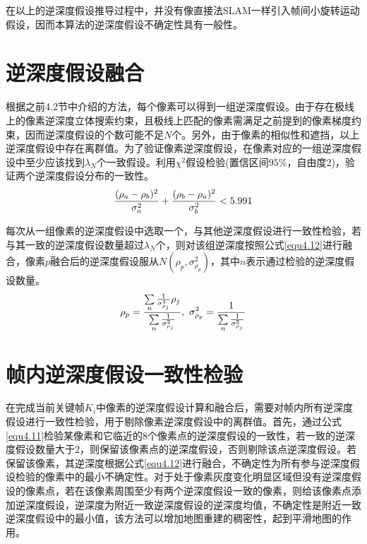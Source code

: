在以上的逆深度假设推导过程中，并没有像直接法SLAM一样引入帧间小旋转运动假设，因而本算法的逆深度假设不确定性具有一般性。


\section{逆深度假设融合}
根据之前4.2节中介绍的方法，每个像素可以得到一组逆深度假设。由于存在极线上的像素逆深度立体搜索约束，且极线上匹配的像素需满足之前提到的像素梯度约束，因而逆深度假设的个数可能不足$N$个。另外，由于像素的相似性和遮挡，以上逆深度假设中存在离群值。为了验证像素逆深度假设，在像素对应的一组逆深度假设中至少应该找到$\lambda_N$个一致假设。利用$\chi^2$假设检验(置信区间$95\%$，自由度2)，验证两个逆深度假设分布的一致性。
\begin{equation}
\label{equ4.11}
{ (\rho_a - \rho_b)^2 \over \sigma_a^2 }+{ (\rho_b - \rho_a)^2 \over \sigma_b^2} < 5.991
\end{equation}

每次从一组像素的逆深度假设中选取一个，与其他逆深度假设进行一致性检验，若与其一致的逆深度假设数量超过$\lambda_N$个，则对该组逆深度按照公式\ref{equ4.12}进行融合，像素$p$融合后的逆深度假设服从$N(\rho_p,\sigma_{\rho_p}^2)$，其中$n$表示通过检验的逆深度假设数量。
\begin{equation}
\label{equ4.12}
\rho_p = { {\sum\limits_n {1 \over \sigma_{\rho_j}^2} \rho_j } \over \sum\limits_n {1 \over \sigma_{\rho_j}^2}  }, \ 
\sigma_{\rho_p}^2 = {1 \over  \sum\limits_n { 1 \over \sigma_{\rho_j}^2}  }
\end{equation}


\section{帧内逆深度假设一致性检验}
在完成当前关键帧$K_i$中像素的逆深度假设计算和融合后，需要对帧内所有逆深度假设进行一致性检验，用于剔除像素逆深度假设中的离群值。首先，通过公式\ref{equ4.11}检验某像素和它临近的8个像素点的逆深度假设的一致性，若一致的逆深度假设数量大于2，则保留该像素点的逆深度假设，否则剔除该点逆深度假设。若保留该像素，其逆深度根据公式\ref{equ4.12}进行融合，不确定性为所有参与逆深度假设检验的像素中的最小不确定性。对于处于像素灰度变化明显区域但没有逆深度假设的像素点，若在该像素周围至少有两个逆深度假设一致的像素，则给该像素点添加逆深度假设，逆深度为附近一致逆深度假设的逆深度均值，不确定性是附近一致逆深度假设中的最小值，该方法可以增加地图重建的稠密性，起到平滑地图的作用。

